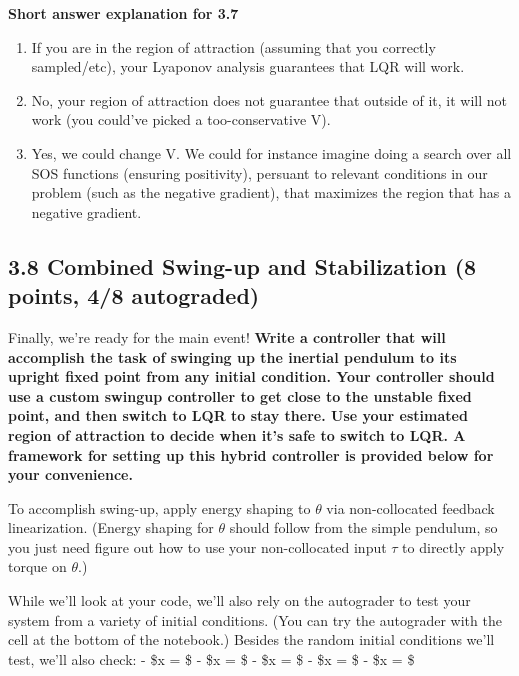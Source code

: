 \documentclass[11pt]{article}
\begin{document}
    \textbf{Short answer explanation for 3.7}

\begin{enumerate}
\def\labelenumi{\arabic{enumi})}
\item
  If you are in the region of attraction (assuming that you correctly
  sampled/etc), your Lyaponov analysis guarantees that LQR will work.
\item
  No, your region of attraction does not guarantee that outside of it,
  it will not work (you could've picked a too-conservative V).
\item
  Yes, we could change V. We could for instance imagine doing a search
  over all SOS functions (ensuring positivity), persuant to relevant
  conditions in our problem (such as the negative gradient), that
  maximizes the region that has a negative gradient.
\end{enumerate}

    \subsection{3.8 Combined Swing-up and Stabilization (8 points, 4/8
autograded)}\label{combined-swing-up-and-stabilization-8-points-48-autograded}

Finally, we're ready for the main event! \textbf{Write a controller that
will accomplish the task of swinging up the inertial pendulum to its
upright fixed point from any initial condition. Your controller should
use a custom swingup controller to get close to the unstable fixed
point, and then switch to LQR to stay there. Use your estimated region
of attraction to decide when it's safe to switch to LQR. A framework for
setting up this hybrid controller is provided below for your
convenience.}

To accomplish swing-up, apply energy shaping to \(\theta\) via
non-collocated feedback linearization. (Energy shaping for \(\theta\)
should follow from the simple pendulum, so you just need figure out how
to use your non-collocated input \(\tau\) to directly apply torque on
\(\theta\).)

While we'll look at your code, we'll also rely on the autograder to test
your system from a variety of initial conditions. (You can try the
autograder with the cell at the bottom of the notebook.) Besides the
random initial conditions we'll test, we'll also check: - \$x =
\left[ 0, 0, 0, 0 \right] \$ - \$x = \left[ \pi, 0, 0, 0 \right] \$ -
\$x = \left[ 3\pi, 0, 0, 0 \right] \$ - \$x =
\left[ 0, -100, 0, 0 \right] \$ - \$x = \left[ 0, 0, 0, 20 \right] \$
\end{document}
